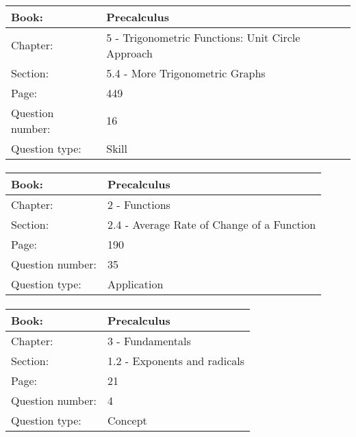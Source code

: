 \documentclass{article}
\begin{document}
   \paragraph{}
   \begin{tabularx}{1\textwidth}{
           p{}
           p{}
       }
       \toprule
       Book: & Precalculus
       \\
       \midrule
       Chapter: & 5 - Trigonometric Functions: Unit Circle Approach
       \\
       \midrule
       Section: & 5.4 - More Trigonometric Graphs
       \\
       \midrule
       Page: & 449
       \\
       \midrule
       Question number: & 16
       \\
       \midrule
       Question type: & Skill
       \\
       \bottomrule
   \end{tabularx}



   \paragraph{}
   \begin{tabularx}{1\textwidth}{
           p{}
           p{}
       }
       \toprule
       Book: & Precalculus
       \\
       \midrule
       Chapter: & 2 - Functions
       \\
       \midrule
       Section: & 2.4 - Average Rate of Change of a Function
       \\
       \midrule
       Page: & 190
       \\
       \midrule
       Question number: & 35
       \\
       \midrule
       Question type: & Application
       \\
       \bottomrule
   \end{tabularx}



   \paragraph{}
   \begin{tabularx}{1\textwidth}{
           p{}
           p{}
       }
       \toprule
       Book: & Precalculus
       \\
       \midrule
       Chapter: & 3 - Fundamentals
       \\
       \midrule
       Section: & 1.2 - Exponents and radicals
       \\
       \midrule
       Page: & 21
       \\
       \midrule
       Question number: & 4
       \\
       \midrule
       Question type: & Concept
       \\
       \bottomrule
   \end{tabularx}
\end{document}
